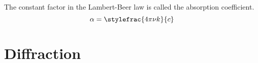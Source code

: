     \begin{definition}
        The constant factor in the Lambert-Beer law is called the absorption coefficient.
        \begin{equation}
	        \label{optics:absorption_coefficient}
    	    \alpha = \stylefrac{4\pi\nu k}{c}
        \end{equation}
    \end{definition}

\section{Diffraction}
	